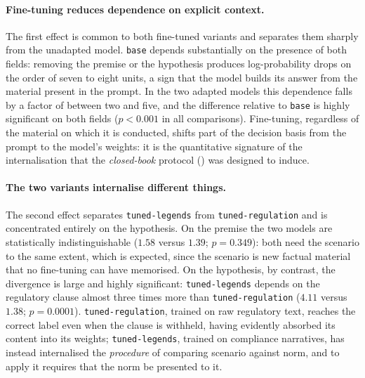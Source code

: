 \documentclass[pdflatex, sn-apa]{sn-jnl}%
\theoremstyle{thmstyleone}%
\theoremstyle{thmstyletwo}%
\theoremstyle{thmstylethree}%
\newcommand{\modelbase}{\texttt{base}}
\newcommand{\modellegends}{\texttt{tuned-legends}}
\newcommand{\modelreg}{\texttt{tuned-regulation}}
\begin{document}
\paragraph{Fine-tuning reduces dependence on explicit context.}
The first effect is common to both fine-tuned variants and separates them sharply
from the unadapted model. \modelbase{} depends substantially on the presence of
both fields: removing the premise or the hypothesis produces log-probability
drops on the order of seven to eight units, a sign that the model builds its
answer from the material present in the prompt. In the two adapted models this
dependence falls by a factor of between two and five, and the difference relative
to \modelbase{} is highly significant on both fields ($p < 0.001$ in all
comparisons). Fine-tuning, regardless of the material on which it is conducted,
shifts part of the decision basis from the prompt to the model's weights: it is
the quantitative signature of the internalisation that the \emph{closed-book}
protocol () was designed to induce.

\paragraph{The two variants internalise different things.}
The second effect separates \modellegends{} from \modelreg{} and is concentrated
entirely on the hypothesis. On the premise the two models are statistically
indistinguishable ($1.58$ versus $1.39$; $p = 0.349$): both need the scenario to
the same extent, which is expected, since the scenario is new factual material
that no fine-tuning can have memorised. On the hypothesis, by contrast, the
divergence is large and highly significant: \modellegends{} depends on the
regulatory clause almost three times more than \modelreg{} ($4.11$ versus $1.38$;
$p = 0.0001$). \modelreg{}, trained on raw regulatory text, reaches the correct
label even when the clause is withheld, having evidently absorbed its content
into its weights; \modellegends{}, trained on compliance narratives, has instead
internalised the \emph{procedure} of comparing scenario against norm, and to apply
it requires that the norm be presented to it.
\end{document}

